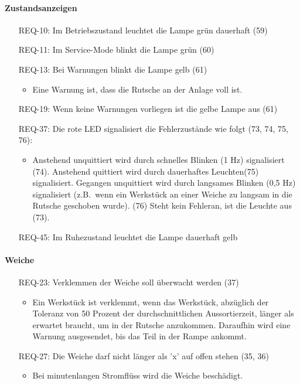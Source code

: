 \paragraph{Zustandsanzeigen}
\begin{itemize}
    \item[REQ-10:] Im Betriebszustand leuchtet die Lampe grün dauerhaft (59)
    \item[REQ-11:] Im Service-Mode blinkt die Lampe grün (60)
    \item[REQ-13:] Bei Warnungen blinkt die Lampe gelb (61)
    \begin{itemize}
        \item Eine Warnung ist, dass die Rutsche an der Anlage voll ist.
    \end{itemize}
    \item[REQ-19:] Wenn keine Warnungen vorliegen ist die gelbe Lampe aus (61)
    \item[REQ-37:] Die rote LED signalisiert die Fehlerzustände wie folgt (73, 74, 75, 76):
    \begin{itemize}
        \item Anstehend unquittiert wird durch schnelles Blinken (1 Hz) signalisiert (74).
        Anstehend quittiert wird durch dauerhaftes Leuchten(75) signalisiert.
        Gegangen unquittiert wird durch langsames Blinken (0,5 Hz) signalisiert (z.B.\ wenn ein
        Werkstück an einer Weiche zu langsam in die Rutsche geschoben wurde).
        (76) Steht kein Fehleran, ist die Leuchte aus (73).
    \end{itemize}
    \item[REQ-45:] Im Ruhezustand leuchtet die Lampe dauerhaft gelb
\end{itemize}

\paragraph{Weiche}
\begin{itemize}
    \item[REQ-23:] Verklemmen der Weiche soll überwacht werden (37)
    \begin{itemize}
        \item Ein Werkstück ist verklemmt, wenn das Werkstück, abzüglich der Toleranz von 50 Prozent
        der durchschnittlichen Aussortierzeit, länger als erwartet braucht, um in der Rutsche anzukommen.
        Daraufhin wird eine Warnung ausgesendet, bis das Teil in der Rampe ankommt.
    \end{itemize}
    \item[REQ-27:] Die Weiche darf nicht länger als 'x' auf offen stehen (35, 36)
    \begin{itemize}
        \item Bei minutenlangen Stromflüss wird die Weiche beschädigt.
    \end{itemize}
\end{itemize}

